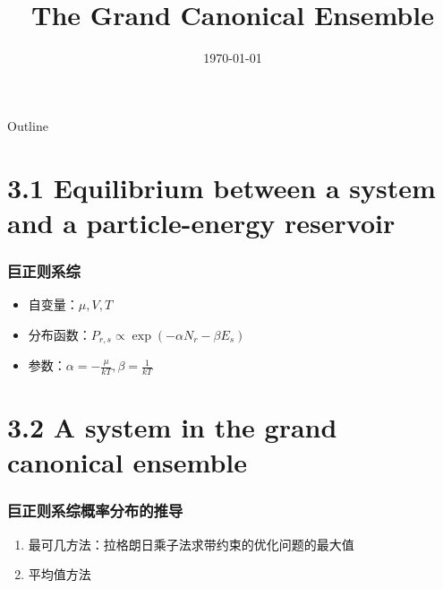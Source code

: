 \documentclass{ctexbeamer}
\title{The Grand Canonical Ensemble}
\date{\today}
\begin{document}
\begin{frame}
	\titlepage
\end{frame}
\begin{frame}{Outline}
    \tableofcontents
\end{frame}
\section{3.1 Equilibrium between 
a system and a particle-energy reservoir
}

\begin{frame}
\frametitle{巨正则系综}
\begin{itemize}
    \item 自变量：$\mu,V,T$
    \item 分布函数：$P_{r,s} \propto \exp(-\alpha N_r - \beta E_s)$
    \item 参数：$\alpha=-\frac{\mu}{kT}, \beta = \frac{1}{kT}$
\end{itemize}

\end{frame}
\section{3.2 A system in the grand canonical ensemble
}
\begin{frame}
    \frametitle{巨正则系综概率分布的推导}
    \begin{enumerate}
        \item 最可几方法：拉格朗日乘子法求带约束的优化问题的最大值
        \item 平均值方法
    \end{enumerate}
    
    \end{frame}
\end{document}
